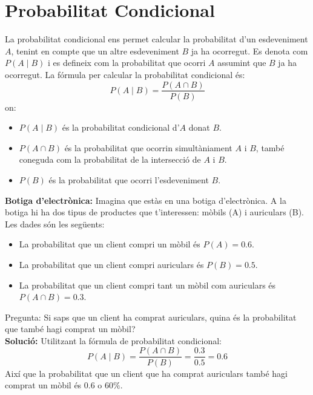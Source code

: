 \documentclass[12pt]{article}
\begin{document}
\newpage

\section{Probabilitat Condicional}

\begin{concept}  [title=Definició] \noindent La probabilitat condicional ens permet calcular la probabilitat d'un esdeveniment $A$, tenint en compte que un altre esdeveniment $B$ ja ha ocorregut. Es denota com $P(A \mid B)$ i es defineix com la probabilitat que ocorri $A$ assumint que $B$ ja ha ocorregut. La fórmula per calcular la probabilitat condicional és:
\[
P(A \mid B) = \frac{P(A \cap B)}{P(B)}
\]
on:  
\begin{itemize}
    \item $P(A \mid B)$ és la probabilitat condicional d'$A$ donat $B$.
    \item $P(A \cap B)$ és la probabilitat que ocorrin simultàniament $A$ i $B$, també coneguda com la probabilitat de la intersecció de $A$ i $B$.
    \item $P(B)$ és la probabilitat que ocorri l'esdeveniment $B$.
\end{itemize}
\end{concept}

\begin{exemple}  [title=Exemple 1]  \noindent 
\textbf{Botiga d'electrònica:}  
Imagina que estàs en una botiga d'electrònica. A la botiga hi ha dos tipus de productes que t'interessen: mòbils (A) i auriculars (B). Les dades són les següents:

\begin{itemize}
    \item La probabilitat que un client compri un mòbil és $P(A) = 0.6$.
    \item La probabilitat que un client compri auriculars és $P(B) = 0.5$.
    \item La probabilitat que un client compri tant un mòbil com auriculars és $P(A \cap B) = 0.3$.
\end{itemize}
Pregunta: Si saps que un client ha comprat auriculars, quina és la probabilitat que també hagi comprat un mòbil? \\

\textbf{Solució:}  
Utilitzant la fórmula de probabilitat condicional:
\[
P(A \mid B) = \frac{P(A \cap B)}{P(B)} = \frac{0.3}{0.5} = 0.6
\]
Així que la probabilitat que un client que ha comprat auriculars també hagi comprat un mòbil és $0.6$ o $60\%$.
\end{exemple}
\end{document}
